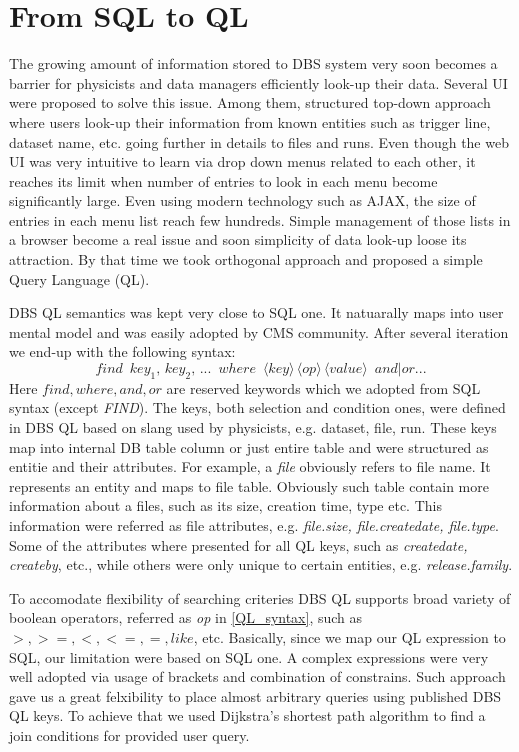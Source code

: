 \documentclass[a4paper]{jpconf}
\begin{document}
\section{From SQL to QL}
The growing amount of information stored to DBS system very soon
becomes a barrier for physicists and data managers efficiently
look-up their data. Several UI were proposed to solve this issue.
Among them, structured top-down approach where users look-up their
information from known entities such as trigger line, dataset name, etc.
going further in details to files and runs. Even though the web UI
was very intuitive to learn via drop down menus related to each
other, it reaches its limit when number of entries to look in each menu
become significantly large. Even using modern technology such as
AJAX, the size of entries in each menu list reach few hundreds.
Simple management of those lists in a browser become a real issue and
soon simplicity of data look-up loose its attraction. By that time
we took orthogonal approach and proposed a simple Query Language (QL).

DBS QL semantics was kept very close to SQL one. It natuarally
maps into user mental model and was easily adopted by CMS
community. After several iteration we end-up with the following syntax:
\[
find\,\,\,
key_1,\, key_2,\, ...\,\,\, where\,\,\,
\langle key\rangle\, 
\langle op\rangle\, 
\langle value\rangle \,\,\, and|or ...
\label{QL_syntax}
\]
Here $find, where, and, or$ are reserved keywords
which we adopted from SQL syntax (except {\it FIND}). The keys,
both selection and condition ones, were defined
in DBS QL based on slang used by physicists, e.g. dataset, file, run. 
These keys map into internal DB table column or just entire table and 
were structured as entitie and their attributes. For example,
a {\it file} obviously refers to file name. It represents an
entity and maps to file table. Obviously such table
contain more information about a files, such as its size, creation time,
type etc. This information were referred as file attributes, e.g.
{\it file.size, file.createdate, file.type}. Some of the attributes
where presented for all QL keys, such as {\it createdate, createby}, etc.,
while others were only unique to certain entities, e.g. {\it release.family}.

To accomodate flexibility of searching criteries DBS QL supports
broad variety of boolean operators, referred as {\it op} in
\ref{QL_syntax}, such as $>, >=, <, <=, =, like$, etc.  Basically,
since we map our QL expression to SQL, our limitation were based
on SQL one. A complex expressions were very well adopted via
usage of brackets and combination of constrains.
Such approach gave us a great felxibility to place almost
arbitrary queries using published DBS QL keys. To achieve that
we used Dijkstra’s shortest path algorithm to find a join conditions
for provided user query.
\end{document}
